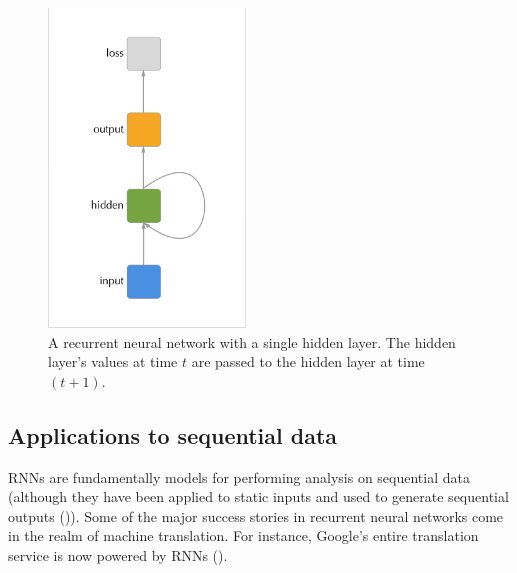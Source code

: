\documentclass[]{book}
\theoremstyle{definition}
\theoremstyle{definition}
\theoremstyle{definition}
\theoremstyle{remark}
\begin{document}
\begin{figure}
\includegraphics[height=320]{figures/rnn_compact} \caption{A recurrent neural network with a single hidden layer. The hidden layer's values at time $t$ are passed to the hidden layer at time $(t + 1)$.}\label{fig:cyclegraph}
\end{figure}

\subsection{Applications to sequential
data}\label{applications-to-sequential-data}

RNNs are fundamentally models for performing analysis on sequential data
(although they have been applied to static inputs and used to generate
sequential outputs (\citet{rnn_captions})). Some of the major success
stories in recurrent neural networks come in the realm of machine
translation. For instance, Google's entire translation service is now
powered by RNNs (\citet{google_translate}).
\end{document}
